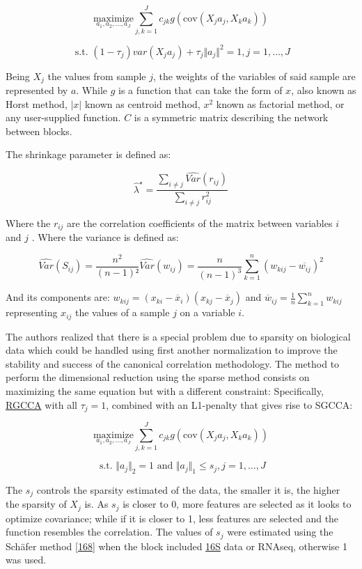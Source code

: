 \documentclass[
  12pt,
  a4paper,
  twoside,
  openright]{book}
\begin{document}
\[
\underset{a_1,a_2, \dots,a_J}{\text{maximize}} \sum_{j, k = 1}^J c_{jk} g( \text{cov}(X_j a_j, X_k a_k))
\]

\[
\text{ s.t. } (1-\tau_j)var(X_j a_j)+\tau_j \Vert a_j \Vert^2 = 1, j=1, \ldots, J
\]

Being \(X_j\) the values from sample \(j\), the weights of the variables of said sample are represented by \(a\).
While \(g\) is a function that can take the form of \(x\), also known as Horst method, \(|x|\) known as centroid method, \(x^2\) known as factorial method, or any user-supplied function.
\(C\) is a symmetric matrix describing the network between blocks.

The shrinkage parameter is defined as:

\[
\widehat{\lambda}^{\star} = \dfrac{\sum_{i\neq j}\widehat{Var}(r_{ij})}{\sum_{i \neq j}r_{ij}^2}
\]

Where the \(r_{ij}\) are the correlation coefficients of the matrix between variables \(i\) and \(j\) .
Where the variance is defined as:

\[
\widehat{Var}(S_{ij}) = \dfrac{n^2}{{(n-1)}²} \widehat{Var}({w}_{ij}) = \dfrac{n}{{(n-1)}^3} \sum_{k=1}^n ( w_{kij} - \overline{w_{ij}})^2
\]

And its components are: \(w_{kij}=(x_{ki}-\overline{x}_i)(x_{kj}-\overline{x}_j)\) and \(\overline{w}_{ij}=\frac{1}{n}\sum_{k=1}^nw_{kij}\) representing \(x_{ij}\) the values of a sample \(j\) on a variable \(i\).

The authors realized that there is a special problem due to sparsity on biological data which could be handled using first another normalization to improve the stability and success of the canonical correlation methodology.
The method to perform the dimensional reduction using the sparse method consists on maximizing the same equation but with a different constraint: Specifically, \protect\hyperlink{acronyms_RGCCA}{RGCCA} with all \(\tau_j = 1\), combined with an L1-penalty that gives rise to SGCCA:

\[
\underset{a_1,a_2, \dots,a_J}{\text{maximize}} \sum_{j, k = 1}^J c_{jk}g( \text{cov}(X_j a_j, X_k a_k))
\]

\[
\text{ s.t. } \Vert a_j \Vert_2 = 1 \text{ and } \Vert a_j \Vert_1 \le s_j, j=1,\ldots,J
\]

The \(s_j\) controls the sparsity estimated of the data, the smaller it is, the higher the sparsity of \(X_j\) is.
As \(s_j\) is closer to 0, more features are selected as it looks to optimize covariance; while if it is closer to 1, less features are selected and the function resembles the correlation.
The values of \(s_j\) were estimated using the Schäfer method {[}\protect\hyperlink{ref-schuxe4fer2005}{168}{]} when the block included \protect\hyperlink{acronyms_16S}{16S} data or RNAseq, otherwise 1 was used.
\end{document}
